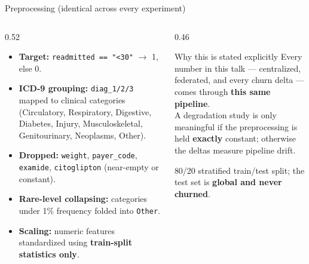 \documentclass[aspectratio=169, 11pt]{beamer}
\begin{document}
\begin{frame}{Preprocessing (identical across every experiment)}
\begin{columns}[T]
\begin{column}{0.52\textwidth}
\begin{itemize}\small
\item \textbf{Target:} \texttt{readmitted == "<30"} $\rightarrow$ 1, else 0.
\item \textbf{ICD-9 grouping:} \texttt{diag\_1/2/3} mapped to clinical
      categories (Circulatory, Respiratory, Digestive, Diabetes, Injury,
      Musculoskeletal, Genitourinary, Neoplasms, Other).
\item \textbf{Dropped:} \texttt{weight}, \texttt{payer\_code},
      \texttt{examide}, \texttt{citoglipton} (near-empty or constant).
\item \textbf{Rare-level collapsing:} categories under 1\% frequency folded
      into \texttt{Other}.
\item \textbf{Scaling:} numeric features standardized using
      \textbf{train-split statistics only}.
\end{itemize}
\end{column}
\begin{column}{0.46\textwidth}
\begin{block}{Why this is stated explicitly}
Every number in this talk --- centralized, federated, and every churn
delta --- comes through \textbf{this same pipeline}.\\[0.5em]
A degradation study is only meaningful if the preprocessing is held
\textbf{exactly} constant; otherwise the deltas measure pipeline drift.
\end{block}
\vspace{0.3em}
{\footnotesize 80/20 stratified train/test split; the test set is
\textbf{global and never churned}.}
\end{column}
\end{columns}
\end{frame}
\end{document}

